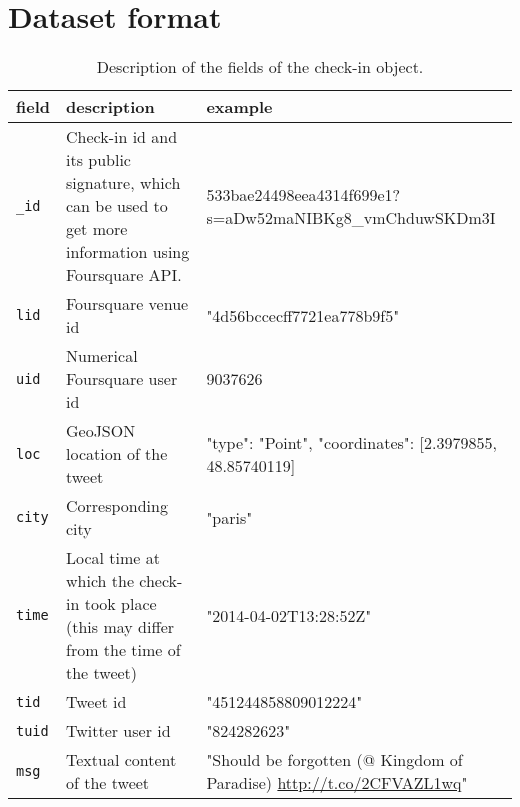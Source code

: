 \clearpage
{}
\chapter{Dataset format}
\label{chap:appendix}

\begin{table}[ht]
    \centering
    \begin{tabularx}{\textwidth}{lXX}
        \toprule
        field & description & example\\
        \midrule
        \texttt{\_id} & Check-in id and its public signature, which can be
used to get more information using Foursquare API. &
533bae24498eea4314f699e1?s=aDw52maNIBKg8\_vmChduwSKDm3I \\
        \texttt{lid} & Foursquare venue id & "4d56bccecff7721ea778b9f5"\\
        \texttt{uid} & Numerical Foursquare user id & 9037626\\
        \texttt{loc} & GeoJSON location of the tweet & {"type": "Point", "coordinates": [2.3979855, 48.85740119]}\\
        \texttt{city} & Corresponding city & "paris"\\
        \texttt{time} & Local time at which the check-in took place (this may
differ from the time of the tweet) & "2014-04-02T13:28:52Z"\\
        \texttt{tid} & Tweet id & "451244858809012224"\\
        \texttt{tuid} & Twitter user id & "824282623"\\
        \texttt{msg} & Textual content of the tweet & "Should be forgotten (@
Kingdom of Paradise) \url{http://t.co/2CFVAZL1wq}"\\
        \bottomrule
    \end{tabularx}
    \caption[Check-in format]{Description of the fields of the check-in
    object.\label{tab:checkinfields}}
\end{table}

